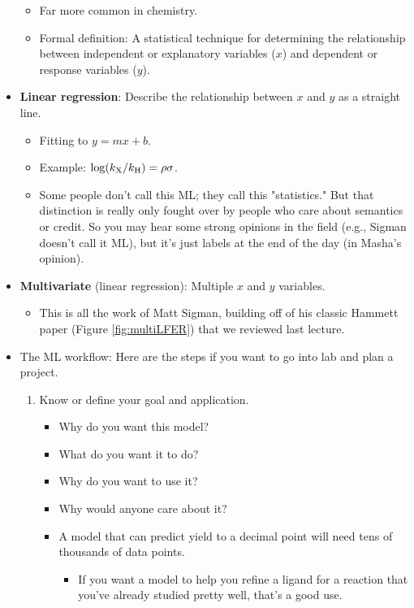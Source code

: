\documentclass[../notes.tex]{subfiles}
\begin{document}
\begin{itemize}
\begin{itemize}
\begin{itemize}
        \end{itemize}
        \item Far more common in chemistry.
        \item Formal definition: A statistical technique for determining the relationship between independent or explanatory variables ($x$) and dependent or response variables ($y$).
    \end{itemize}
    \item \textbf{Linear regression}: Describe the relationship between $x$ and $y$ as a straight line.
    \begin{itemize}
        \item Fitting to $y=mx+b$.
        \item Example: $\log(k_{\ce{X}}/k_{\ce{H}})=\rho\sigma$.
        \item Some people don't call this ML; they call this "statistics." But that distinction is really only fought over by people who care about semantics or credit. So you may hear some strong opinions in the field (e.g., Sigman doesn't call it ML), but it's just labels at the end of the day (in Masha's opinion).
    \end{itemize}
    \item \textbf{Multivariate} (linear regression): Multiple $x$ and $y$ variables.
    \begin{itemize}
        \item This is all the work of Matt Sigman, building off of his classic Hammett paper (Figure \ref{fig:multiLFER}) that we reviewed last lecture.
    \end{itemize}
    \item The ML workflow: Here are the steps if you want to go into lab and plan a project.
    \begin{enumerate}[start=0]
        \item Know or define your goal and application.
        \begin{itemize}
            \item Why do you want this model?
            \item What do you want it to do?
            \item Why do you want to use it?
            \item Why would anyone care about it?
            \item A model that can predict yield to a decimal point will need tens of thousands of data points.
            \begin{itemize}
                \item If you want a model to help you refine a ligand for a reaction that you've already studied pretty well, that's a good use.

\end{itemize}
\end{itemize}
\end{enumerate}
\end{itemize}
\end{document}
